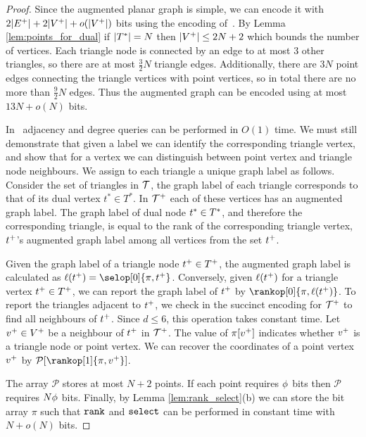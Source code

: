 {\begin{proof}
Since the augmented planar graph is simple, we can encode it with 
$2|E^+| + 2|V^+| + o(|V^+|)$ bits 
using the encoding of~\cite{DBLP:journals/siamcomp/ChiangLL05}. 
By Lemma \ref{lem:points_for_dual} if $|T^*| = N$ then 
$|V^+| \le 2N+2$ which bounds the number of vertices. 
Each triangle node is connected by an edge to at most $3$ 
other triangles, so there are at most $\frac{3}{2} N$ triangle edges. 
Additionally, there are $3N$ point edges connecting the 
triangle vertices with point vertices, so in total there are no 
more than $\frac{9}{2}N$ edges. 
Thus the augmented graph can be encoded using at most $13N + o(N)$ bits. 

In~\cite{DBLP:journals/siamcomp/ChiangLL05} adjacency and degree queries
 can be performed in $O(1)$ time. 
We must still demonstrate that given a label we can identify the corresponding 
triangle vertex, and show that for a vertex we can distinguish between point 
vertex and triangle node neighbours. 
We assign to each triangle a unique graph label as follows. 
Consider the set of triangles in $\mathcal{T}$, the graph label of each 
triangle corresponds to that of its dual vertex $t^* \in T^*$. 
In $\mathcal{T}^+$ each of these vertices has an augmented graph label.  
The graph label of dual node $t^* \in T^*$, and therefore the 
corresponding triangle, is equal to the rank of the corresponding 
triangle vertex, $t^+$'s augmented graph label among all 
vertices from the set $t^+$. 

Given the graph label of a triangle node $t^+ \in T^+$,
 the augmented graph label is calculated as $\ell(t^{\augdualsym}) = 
\selop[0]{\pi, \augdual{t}}$.
Conversely, given $\ell(t^+)$ for a triangle vertex 
$t^+ \in T^+$, we can report the graph label 
of $t^+$ by $\rankop[0]{\pi,\ell(\augdual{t})}$. 
To report the triangles adjacent to $t^+$, we check in 
the succinct encoding for $\mathcal{T}^+$ to find all neighbours of 
$t^+$. 
Since $d \le 6$, this operation takes constant time. 
Let $v^+ \in V^+$ be a neighbour of $t^+$ in 
$\mathcal{T}^+$. 
The value of $\pi[v^+]$ indicates whether $v^+$ is a 
triangle node or point vertex. 
We can recover the coordinates of a point vertex $v^+$ by 
$\mathcal{P}[\rankop[1]{\pi,\augdual{v}}]$.

The array $\mathcal{P}$ stores at most $N+2$ points. 
If each point requires $\phi$ bits then $\mathcal{P}$ 
requires $N\phi$ bits. 
Finally, by Lemma \ref{lem:rank_select}(b) we can store the bit array 
$\pi$ such that $\texttt{rank}$ and $\texttt{select}$ can be performed in constant time 
with $N + o(N)$ bits.
\end{proof}

}
